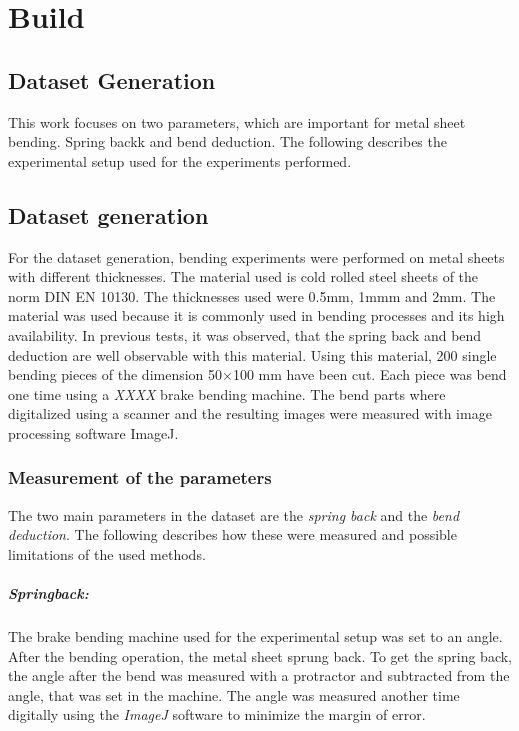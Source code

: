 \chapter{Build}
\section{Dataset Generation}
This work focuses on two parameters, which are important for metal sheet bending. Spring backk and bend deduction. 
The following describes the experimental setup used for the experiments performed. 

\section{Dataset generation} 
For the dataset generation, bending experiments were performed on metal sheets with different thicknesses. 
The material used is cold rolled steel sheets of the norm DIN EN 10130. The thicknesses used were 0.5mm, 1mmm and 2mm. 
The material was used because it is commonly used in bending processes and its high availability. In previous tests, it was observed, that the spring back and bend deduction are well observable with this material. 
Using this material, 200 single bending pieces of the dimension 50×100 mm have been cut. 
Each piece was bend one time using a \textit{XXXX} brake bending machine. The bend parts where digitalized using a scanner and the resulting images were measured with image processing software ImageJ. 



\subsection{Measurement of the parameters}
The two main parameters in the dataset are the \textit{spring back} and the \textit{bend deduction}. 
The following describes how these were measured and possible limitations of the used methods. 

\paragraph{Springback:}
The brake bending machine used for the experimental setup was set to an angle. After the bending operation, the metal sheet sprung back. To get the spring back, the angle after the bend was measured with a protractor and subtracted from the angle, that was set in the machine. The angle was measured another time digitally using the \textit{ImageJ} software to minimize the margin of error.

